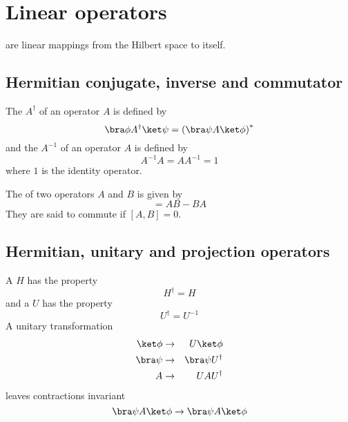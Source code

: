\documentclass[a4paper,12pt]{report}
\begin{document}
\section{Linear operators}

 are linear mappings from the Hilbert space to itself.

\subsection{Hermitian conjugate, inverse and commutator}

The  $A^\dagger$ of an operator $A$ is defined by
\begin{equation}
\bra\phi A^\dagger \ket\psi = \left( \bra\psi A \ket\phi \right)^*
\end{equation}
and the  $A^{-1}$ of an operator $A$ is defined by
\begin{equation}
A^{-1} A = A A^{-1} = 1
\end{equation}
where $1$ is the identity operator.

The  of two operators $A$ and $B$ is given by
\begin{equation}
[A,B] = A B - B A
\end{equation}
They are said to commute if $[A,B] = 0$.

\subsection{Hermitian, unitary and projection operators}

A  $H$ has the property
\begin{equation}
H^\dagger = H
\end{equation}
and a  $U$ has the property
\begin{equation}
U^\dagger = U^{-1}
\end{equation}
A unitary transformation
\begin{eqnarray}
\ket\phi & \to & U \ket\phi
\\
\bra\psi & \to & \bra\psi U^\dagger
\\
A & \to & U A U^\dagger
\end{eqnarray}
leaves contractions invariant
\begin{equation}
\bra\psi A \ket\phi \to \bra\psi A \ket\phi
\end{equation}
\end{document}
